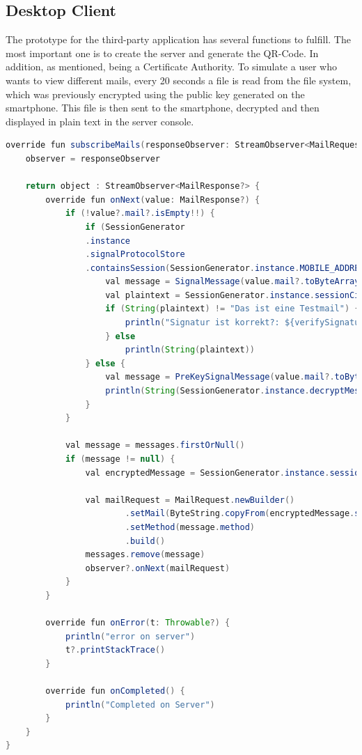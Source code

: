 \documentclass[12pt,oneside,a4paper,parskip]{scrbook}
\begin{document}
\subsection{Desktop Client}
The prototype for the third-party application has several functions to fulfill. The most important one is to create the server and generate the QR-Code. In addition, as mentioned, being a Certificate Authority. To simulate a user who wants to view different mails, every 20 seconds a file is read from the file system, which was previously encrypted using the public key generated on the smartphone. This file is then sent to the smartphone, decrypted and then displayed in plain text in the server console. 
\newpage
\begin{lstlisting}[label=lst:subscribe,
				   language=java,
				   firstnumber=1,
				   caption=Creating a Session]
override fun subscribeMails(responseObserver: StreamObserver<MailRequest>?): StreamObserver<MailResponse?> {
    observer = responseObserver
    
    return object : StreamObserver<MailResponse?> {
        override fun onNext(value: MailResponse?) {
            if (!value?.mail?.isEmpty!!) {
                if (SessionGenerator
                .instance
                .signalProtocolStore
                .containsSession(SessionGenerator.instance.MOBILE_ADDRESS)) {
                    val message = SignalMessage(value.mail?.toByteArray())
                    val plaintext = SessionGenerator.instance.sessionCipher.decrypt(message)
                    if (String(plaintext) != "Das ist eine Testmail") {
                        println("Signatur ist korrekt?: ${verifySignature(plaintext)}")
                    } else
                        println(String(plaintext))
                } else {
                    val message = PreKeySignalMessage(value.mail?.toByteArray())
                    println(String(SessionGenerator.instance.decryptMessage(message)))
                }
            }
    
            val message = messages.firstOrNull()
            if (message != null) {
                val encryptedMessage = SessionGenerator.instance.sessionCipher.encrypt(message.mail.toByteArray())
    
                val mailRequest = MailRequest.newBuilder()
                        .setMail(ByteString.copyFrom(encryptedMessage.serialize()))
                        .setMethod(message.method)
                        .build()
                messages.remove(message)
                observer?.onNext(mailRequest)
            }
        }
    
        override fun onError(t: Throwable?) {
            println("error on server")
            t?.printStackTrace()
        }
    
        override fun onCompleted() {
            println("Completed on Server")
        }
    }
}
\end{lstlisting}
\end{document}
